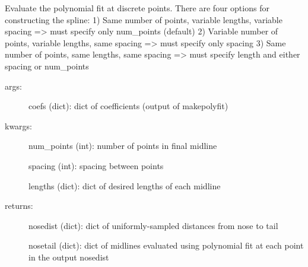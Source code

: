 \documentclass[letterpaper,10pt,openany,oneside]{sphinxmanual}
\begin{document}
\begin{fulllineitems}
\label{index:flipheadtail.evalpolyfit}
Evaluate the polynomial fit at discrete points.
There are four options for constructing the spline:
1) Same number of points, variable lengths, variable spacing
=\textgreater{} must specify only num\_points (default)
2) Variable number of points, variable lengths, same spacing
=\textgreater{} must specify only spacing
3) Same number of points, same lengths, same spacing
=\textgreater{} must specify length and either spacing or num\_points
\begin{description}
\item[{args:}] \leavevmode
coefs (dict): dict of coefficients (output of makepolyfit)

\item[{kwargs:}] \leavevmode
num\_points (int): number of points in final midline

spacing (int): spacing between points

lengths (dict): dict of desired lengths of each midline

\item[{returns:}] \leavevmode
nosedist (dict): dict of uniformly-sampled distances from nose to tail

nosetail (dict): dict of midlines evaluated using polynomial fit at 
each point in the output nosedist

\end{description}

\end{fulllineitems}

\end{document}
